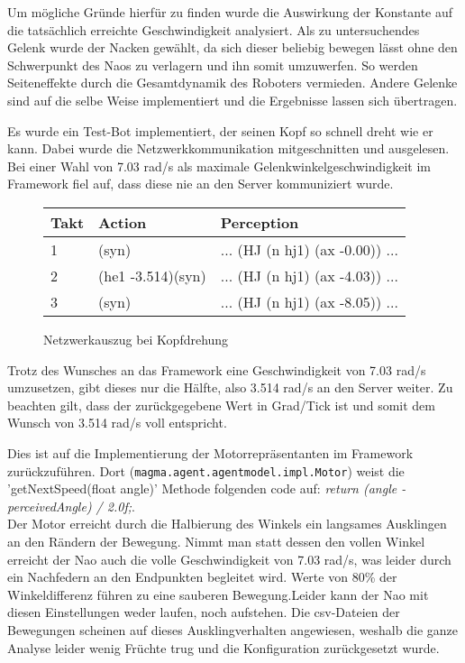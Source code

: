 Um mögliche Gründe hierfür zu finden wurde die Auswirkung der Konstante auf die tatsächlich erreichte Geschwindigkeit analysiert.
Als zu untersuchendes Gelenk wurde der Nacken gewählt, da sich dieser beliebig bewegen lässt ohne den Schwerpunkt des Naos zu verlagern und ihn somit umzuwerfen. So werden Seiteneffekte durch die Gesamtdynamik des Roboters vermieden. Andere Gelenke sind auf die selbe Weise implementiert und die Ergebnisse lassen sich übertragen.

Es wurde ein Test-Bot implementiert, der seinen Kopf so schnell dreht wie er kann. Dabei wurde die Netzwerkkommunikation mitgeschnitten und ausgelesen.
Bei einer Wahl von 7.03 rad/s als maximale Gelenkwinkelgeschwindigkeit im Framework fiel auf, dass diese nie an den Server kommuniziert wurde.

\begin{figure}[H]
	\centering
	\begin{tabularx}{\textwidth}{|X|X|X|}
		\hline
		Takt & Action & Perception\\
		\hline
		1 & (syn) & ... (HJ (n hj1) (ax -0.00)) ...\\
		\hline
        2 & (he1 -3.514)(syn) & ... (HJ (n hj1) (ax -4.03)) ...\\
        \hline
        3 & (syn) & ... (HJ (n hj1) (ax -8.05)) ...\\
		\hline
	\end{tabularx}
	\caption{Netzwerkauszug bei Kopfdrehung}
	\label{fig:networkjointanalysis}
\end{figure}

Trotz des Wunsches an das Framework eine Geschwindigkeit von 7.03 rad/s umzusetzen, gibt dieses nur die Hälfte, also 3.514 rad/s an den Server weiter.
Zu beachten gilt, dass der zurückgegebene Wert in Grad/Tick ist und somit dem Wunsch von 3.514 rad/s voll entspricht.

Dies ist auf die Implementierung der Motorrepräsentanten im Framework zurückzuführen.
Dort (\texttt{magma.agent.agentmodel.impl.Motor}) weist die 'getNextSpeed(float angle)' Methode folgenden code auf: \textit{return (angle - perceivedAngle) / 2.0f;}.\\
Der Motor erreicht durch die Halbierung des Winkels ein langsames Ausklingen an den Rändern der Bewegung. Nimmt man statt dessen den vollen Winkel erreicht der Nao auch die volle Geschwindigkeit von 7.03 rad/s, was leider durch ein Nachfedern an den Endpunkten begleitet wird. Werte von 80\% der Winkeldifferenz führen zu eine sauberen Bewegung.Leider kann der Nao mit diesen Einstellungen weder laufen, noch aufstehen. Die csv-Dateien der Bewegungen scheinen auf dieses Ausklingverhalten angewiesen, weshalb die ganze Analyse leider wenig Früchte trug und die Konfiguration zurückgesetzt wurde.

